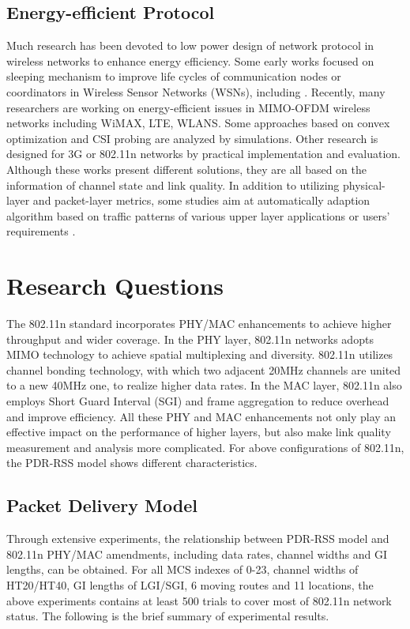 \documentclass[draftclsnofoot,journal,onecolumn,11pt]{IEEEtran}
\begin{document}
\subsection{Energy-efficient Protocol}
Much research has been devoted to low power design of network protocol in wireless networks to enhance energy efficiency. Some early works focused on sleeping mechanism to improve life cycles of communication nodes or coordinators in Wireless Sensor Networks (WSNs), including \cite{1019408} \cite{926982} \cite{Chen:2002:SEC:582455.582461}. Recently, many researchers are working on energy-efficient issues in MIMO-OFDM wireless networks including WiMAX, LTE, WLANS. Some approaches based on convex optimization \cite{5510775} and CSI probing \cite{6214414} are analyzed by simulations. Other research is designed for 3G \cite{Peng:2011:TPS:2030613.2030628} or 802.11n \cite{Li:2012:ERA:2348543.2348585} \cite{Zhang:2011:EEI:2030613.2030637} networks by practical implementation and evaluation. Although these works present different solutions, they are all based on the information of channel state and link quality. In addition to utilizing physical-layer and packet-layer metrics, some studies aim at automatically adaption algorithm based on traffic patterns of various upper layer applications \cite{Han:2012:DPW:2307636.2307675} \cite{Jang:2011:SEM:2079296.2079308} or users' requirements \cite{Zhuang:2010:IEE:1814433.1814464} \cite{Schulman:2010:BPA:1859995.1860006}.


\section{Research Questions}

The 802.11n standard incorporates PHY/MAC enhancements to achieve higher throughput and wider coverage. In the PHY layer, 802.11n networks adopts MIMO technology to achieve spatial multiplexing and diversity. 802.11n utilizes channel bonding technology, with which two adjacent 20MHz channels are united to a new 40MHz one, to realize higher data rates. In the MAC layer, 802.11n also employs Short Guard Interval (SGI) and frame aggregation to reduce overhead and improve efficiency. All these PHY and MAC enhancements not only play an effective impact on the performance of higher layers, but also make link quality measurement and analysis more complicated. For above configurations of 802.11n, the PDR-RSS model shows different characteristics.

\subsection{Packet Delivery Model}
Through extensive experiments, the relationship between PDR-RSS model and 802.11n PHY/MAC amendments, including data rates, channel widths and GI lengths, can be obtained. For all MCS indexes of 0-23, channel widths of HT20/HT40, GI lengths of LGI/SGI, 6 moving routes and 11 locations, the above experiments contains at least 500 trials to cover most of 802.11n network status. The following is the brief summary of experimental results.
\end{document}
